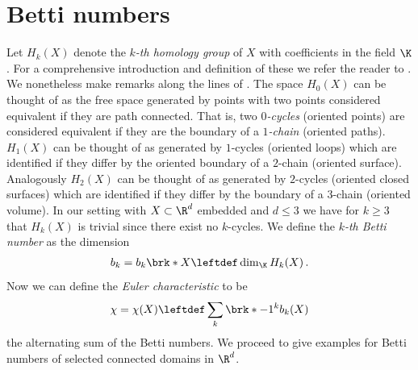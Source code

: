 \section{Betti numbers}


Let $H_k(X)$ denote the \emph{$k$-th homology group} of $X$ with coefficients in the field $\K$.
For a comprehensive introduction and definition of these we refer the reader to \cite[Chapter 2]{Hatcher2002}.
We nonetheless make remarks along the lines of \cite{Cantarella2002}.
The space $H_0(X)$ can be thought of as the free space generated by points with two points
considered equivalent if they are path connected. That is, two \emph{$0$-cycles} (oriented points) are considered equivalent if
they are the boundary of a \emph{$1$-chain} (oriented paths).
$H_1(X)$ can be thought of as generated by $1$-cycles (oriented loops) which are identified if they differ by the oriented boundary of a $2$-chain (oriented surface).
Analogously $H_2(X)$ can be thought of as generated by $2$-cycles (oriented closed surfaces) which are identified if they
differ by the boundary of a $3$-chain (oriented volume).
In our setting with $X\subset\R^d$ embedded and $d\leq3$ we have for $k\geq3$ that $H_k(X)$ is trivial since there exist no $k$-cycles.
We define the \emph{$k$-th Betti number} as the dimension
\begin{align}
  b_k=b_k\brk*{X}\leftdef\dim_\K H_k(X)\,.\label{eq:df_bettiNbrs}
\end{align}
%
Now we can define the \emph{Euler characteristic} to be
\begin{align}
  \chi=\chi(X)\leftdef\sum_{k}\brk*{-1}^{k}b_k(X)\label{eq:Morse_Euler}
\end{align}
the alternating sum of the Betti numbers.
% 
We proceed to give examples for Betti numbers of selected connected domains in $\R^d$.
% 

